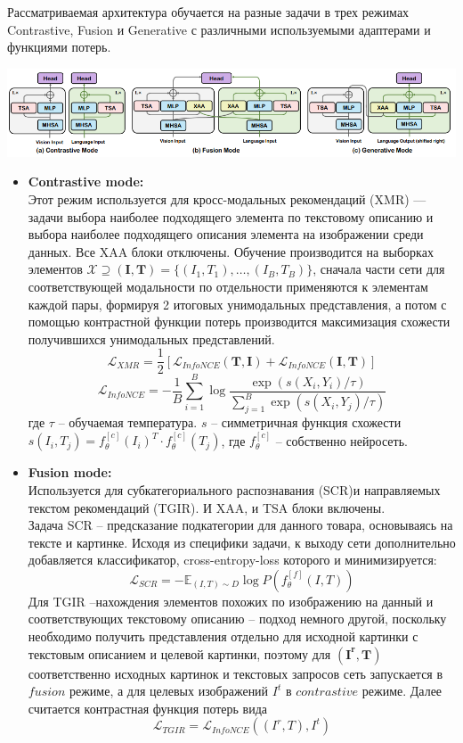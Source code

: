 \documentclass[a4paper,14pt]{extarticle}
\begin{document}
				Рассматриваемая архитектура обучается на разные задачи в трех режимах Contrastive, Fusion и Generative с различными используемыми адаптерами и функциями потерь. 
				
				\includegraphics[scale = 0.7]{pictures/FAME-ViL_modes.png}
				
				\begin{itemize}
					\item[]\textbf{Contrastive mode:}\\
					Этот режим используется для кросс-модальных рекомендаций (XMR) --- задачи выбора наиболее подходящего элемента по текстовому описанию и выбора наиболее подходящего описания элемента на изображении среди данных. Все XAA блоки отключены. Обучение производится на выборках элементов $\mathcal{X} \supseteq (\textbf{I}, \textbf{T}) = \{(I_1, T_1), \dots, (I_B, T_B)\}$, сначала части сети для соответствующей модальности по отдельности применяются к элементам каждой пары, формируя 2 итоговых унимодальных представления, а потом с помощью контрастной функции потерь \cite{https://doi.org/10.48550/arXiv.2004.11362} производится максимизация схожести получившихся унимодальных представлений.
					$$\mathcal{L}_{XMR} = \frac{1}{2} [\mathcal{L}_{InfoNCE}(\mathbf{T}, \mathbf{I}) + \mathcal{L}_{InfoNCE}(\mathbf{I}, \mathbf{T})]$$
					$$\mathcal{L}_{InfoNCE} = -\frac{1}{B}\sum\limits_{i=1}^{B}\log\frac{\exp(s(X_i, Y_i)/\tau)}{\sum_{j=1}^B\exp(s(X_i, Y_j)/\tau)}$$
					где $\tau$ -- обучаемая температура. $s$ -- симметричная функция схожести $s(I_i, T_j) = f_\theta^{[c]}(I_i)^T\cdot f_\theta^{[c]}(T_j)$, где $f_\theta^{[c]}$ -- собственно нейросеть.
					\item[]\textbf{Fusion mode:}\\
					Используется для субкатегориального распознавания (SCR)и направляемых текстом рекомендаций (TGIR). И XAA, и TSA блоки включены. \\
					Задача SCR -- предсказание подкатегории для данного товара, основываясь на тексте и картинке. Исходя из специфики задачи, к выходу сети дополнительно добавляется классификатор, cross-entropy-loss которого и минимизируется:
					$$\mathcal{L}_{SCR} = -\mathbb{E}_{(I,T)\sim D}\log P\left(f_\theta^{[f]}(I, T)\right)$$
					Для TGIR --нахождения элементов похожих по изображению на данный и соответствующих текстовому описанию -- подход немного другой, поскольку необходимо получить представления отдельно для исходной картинки с текстовым описанием и целевой картинки, поэтому для $(\mathbf{I^r}, \mathbf{T})$ соответственно исходных картинок и текстовых запросов сеть запускается в $fusion$ режиме, а для целевых изображений $I^t$ в $contrastive$ режиме. Далее считается контрастная функция потерь вида
					$$\mathcal{L}_{TGIR} = \mathcal{L}_{InfoNCE}((I^r,T), I^t)$$
					

\end{itemize}
\end{document}
